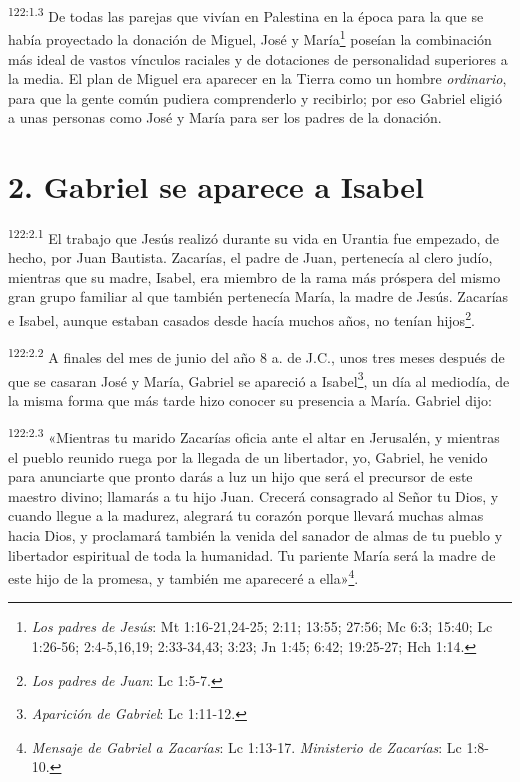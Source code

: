 \par
\textsuperscript{122:1.3} De todas las parejas que vivían en Palestina en la época para la que se había proyectado la donación de Miguel, José y María\footnote{\textit{Los padres de Jesús}: Mt 1:16-21,24-25; 2:11; 13:55; 27:56; Mc 6:3; 15:40; Lc 1:26-56; 2:4-5,16,19; 2:33-34,43; 3:23; Jn 1:45; 6:42; 19:25-27; Hch 1:14.} poseían la combinación más ideal de vastos vínculos raciales y de dotaciones de personalidad superiores a la media. El plan de Miguel era aparecer en la Tierra como un hombre \textit{ordinario}, para que la gente común pudiera comprenderlo y recibirlo; por eso Gabriel eligió a unas personas como José y María para ser los padres de la donación.

\section*{2. Gabriel se aparece a Isabel}
\par
\textsuperscript{122:2.1} El trabajo que Jesús realizó durante su vida en Urantia fue empezado, de hecho, por Juan Bautista. Zacarías, el padre de Juan, pertenecía al clero judío, mientras que su madre, Isabel, era miembro de la rama más próspera del mismo gran grupo familiar al que también pertenecía María, la madre de Jesús. Zacarías e Isabel, aunque estaban casados desde hacía muchos años, no tenían hijos\footnote{\textit{Los padres de Juan}: Lc 1:5-7.}.

\par
\textsuperscript{122:2.2} A finales del mes de junio del año 8 a. de J.C., unos tres meses después de que se casaran José y María, Gabriel se apareció a Isabel\footnote{\textit{Aparición de Gabriel}: Lc 1:11-12.}, un día al mediodía, de la misma forma que más tarde hizo conocer su presencia a María. Gabriel dijo:

\par
\textsuperscript{122:2.3} «Mientras tu marido Zacarías oficia ante el altar en Jerusalén, y mientras el pueblo reunido ruega por la llegada de un libertador, yo, Gabriel, he venido para anunciarte que pronto darás a luz un hijo que será el precursor de este maestro divino; llamarás a tu hijo Juan. Crecerá consagrado al Señor tu Dios, y cuando llegue a la madurez, alegrará tu corazón porque llevará muchas almas hacia Dios, y proclamará también la venida del sanador de almas de tu pueblo y libertador espiritual de toda la humanidad. Tu pariente María será la madre de este hijo de la promesa, y también me apareceré a ella»\footnote{\textit{Mensaje de Gabriel a Zacarías}: Lc 1:13-17. \textit{Ministerio de Zacarías}: Lc 1:8-10.}.

